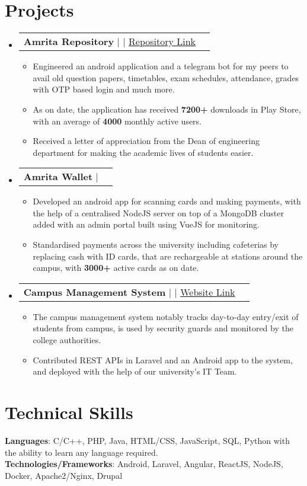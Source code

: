 \documentclass[letterpaper,11pt]{article}
\makeatletter
\newcommand{\resumeItem}[1]{
  \item\small{
    {#1 \vspace{-2pt}}
  }
}
\newcommand{\resumeProjectHeading}[2]{
    \item
    \begin{tabular*}{1.001\textwidth}{l@{\extracolsep{\fill}}r}
      \small#1 & \textbf{\small #2}\\
    \end{tabular*}\vspace{-7pt}
}
\newcommand{\resumeSubHeadingListStart}{\begin{itemize}[leftmargin=0.0in, label={}]}
\newcommand{\resumeSubHeadingListEnd}{\end{itemize}}
\newcommand{\resumeItemListStart}{\begin{itemize}}
\newcommand{\resumeItemListEnd}{\end{itemize}\vspace{-5pt}}
\makeatother
\begin{document}
\section{Projects}
    \vspace{-5pt}
    \resumeSubHeadingListStart
      \resumeProjectHeading
          {\textbf{Amrita Repository} $|$ \text{Android, SQLite, Web Scraping, PHP} $|$ \href{https://github.com/rajkumaar23/amrita-repository}{\underline {Repository Link}}}{}
          \resumeItemListStart
            \resumeItem{Engineered an android application and a telegram bot for my peers to avail old question papers, timetables,  exam schedules,  attendance,  grades with OTP based login and much more.}
            \resumeItem{As on date, the application has received \textbf{7200+} downloads in Play Store,  with an average of \textbf{4000} monthly active users.}
            \resumeItem{Received a letter of appreciation from the Dean of engineering department for making the academic lives of students easier.}
          \resumeItemListEnd
          \vspace{-13pt}
      \resumeProjectHeading
          {\textbf{Amrita Wallet} $|$ \text{Android, NodeJS, MongoDB, jQuery, PM2}}{}
          \resumeItemListStart
            \resumeItem{Developed an android app for scanning cards and making payments,  with the help of a centralised NodeJS server on top of a MongoDB cluster added with an admin portal built using VueJS for monitoring.}          
            \resumeItem{Standardised payments across the university including cafeterias by replacing cash with ID cards,  that are rechargeable at stations around the campus,  with \textbf{3000+} active cards as on date.}
          \resumeItemListEnd 
          \vspace{-13pt}
          \resumeProjectHeading
          {\textbf{Campus Management System} $|$ \text{PHP, Laravel, MySQL, Android} $|$ \href{https://cms.cb.amrita.edu/humans.txt}{\underline{Website Link}}}{}
          \resumeItemListStart
            \resumeItem{The campus management system notably tracks day-to-day entry/exit of students from campus,  is used by security guards and monitored by the college authorities.}
            \resumeItem{Contributed REST APIs in Laravel and an Android app  to the system,  and deployed with the help of our university’s IT Team.}
          \resumeItemListEnd 
    \resumeSubHeadingListEnd
\vspace{-15pt}


%
\section{Technical Skills}
 \begin{itemize}[leftmargin=0.15in, label={}]
    \small{\item{
     \textbf{Languages}{: C/C++, PHP, Java, HTML/CSS, JavaScript, SQL, Python with the ability to learn any language required.} \\
     \textbf{Technologies/Frameworks}{: Android, Laravel, Angular, ReactJS, NodeJS, Docker, Apache2/Nginx, Drupal} \\
    }}
 \end{itemize}
 \vspace{-16pt}
\end{document}
